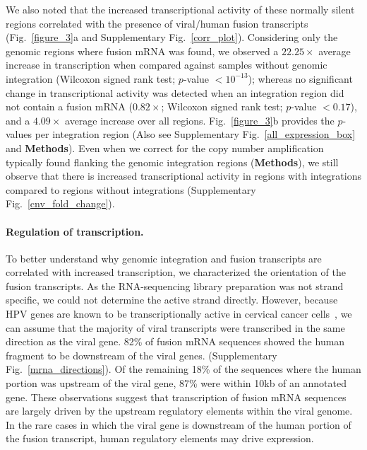 \documentclass[a4,center,fleqn]{NAR}
\begin{document}
 We also noted that the increased transcriptional activity of these
 normally silent regions correlated with the presence of viral/human
 fusion transcripts (Fig.~\ref{figure_3}a
 and Supplementary Fig.~\ref{corr_plot}). Considering only the genomic regions where fusion
 mRNA was found, we observed a $22.25\times$ average increase in
 transcription when compared against samples without genomic
 integration (Wilcoxon signed rank test; $p$-value $<10^{-13}$);
 whereas no significant change in transcriptional activity was
 detected when an integration region did not contain a fusion mRNA
 ($0.82\times$; Wilcoxon signed rank test; $p$-value
 $<0.17$), and a $4.09\times$ average increase over all regions. Fig.~\ref{figure_3}b provides the $p$-values per
 integration region (Also see Supplementary Fig.~\ref{all_expression_box} and
 \textbf{Methods}).  Even when we correct for the copy number amplification typically found flanking the genomic
 integration regions (\textbf{Methods}), we still observe that there is increased transcriptional
 activity in regions with integrations compared to regions without integrations (Supplementary Fig.~\ref{cnv_fold_change}).


\paragraph{\textbf{Regulation of transcription}.} To better understand why genomic integration and fusion transcripts
are correlated with increased transcription, we characterized the
orientation of the fusion transcripts. As the RNA-sequencing library
preparation was not strand specific, we could not determine the active
strand directly. However, because HPV genes are known to be
transcriptionally active in cervical cancer
cells~\cite{Johansson2013}, we can assume that the majority of viral
transcripts were transcribed in the same direction as the viral
gene. 82\% of fusion mRNA sequences showed the human fragment to be
downstream of the viral genes.  (Supplementary Fig.~\ref{mrna_directions}). Of the
remaining 18\% of the sequences where the human portion was upstream
of the viral gene, 87\% were within 10kb of an annotated gene.  These
observations suggest that transcription of fusion mRNA sequences are
largely driven by the upstream regulatory elements within the viral
genome.  In the rare cases in which the viral gene is downstream of
the human portion of the fusion transcript, human regulatory elements
may drive expression.
\end{document}

